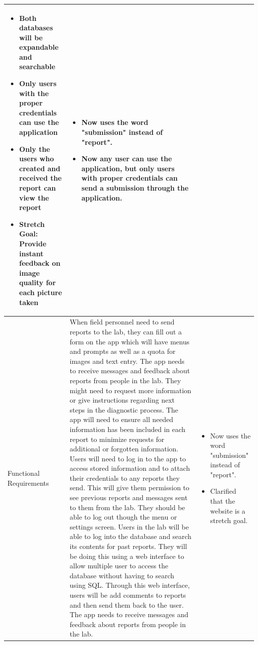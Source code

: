 \documentclass[onecolumn, draftclsnofoot,10pt, compsoc]{IEEEtran}
\begin{document}
\begin{table}[!hbt]
\begin{tabularx}{\textwidth}{|>{\setlength\hsize{.6\hsize}\setlength\linewidth{\hsize}}X|>{\setlength\hsize{1.6\hsize}\setlength\linewidth{\hsize}}X|>{\setlength\hsize{.8\hsize}\setlength\linewidth{\hsize}}X|}
\begin{itemize}
\item Both databases will be expandable and searchable

\item Only users with the proper credentials can use the application

\item Only the users who created and received the report can view the report

\item Stretch Goal: Provide instant feedback on image quality for each picture taken

\end{itemize}
&
\begin{itemize}
    \item Now uses the word "submission" instead of "report".
    \item Now any user can use the application, but only users with proper credentials can send a submission through the application. 
\end{itemize}\\

\hline

Functional Requirements
&

When field personnel need to send reports to the lab, they can fill out a form on the app which will have menus and prompts as well as a quota for images and text entry.
\newline
The app needs to receive messages and feedback about reports from people in the lab. 
They might need to request more information or give instructions regarding next steps in the diagnostic process. 
The app will need to ensure all needed information has been included in each report to minimize requests for additional or forgotten information. 
\newline
Users will need to log in to the app to access stored information and to attach their credentials to any reports they send. This will give them permission to see previous reports and messages sent to them from the lab. 
They should be able to log out though the menu or settings screen. 
\newline 
Users in the lab will be able to log into the database and search its contents for past reports. They will be doing this using a web interface to allow multiple user to access the database without having to search using SQL. Through this web interface, users will be add comments to reports and then send them back to the user. 
\newline
The app needs to receive messages and feedback about reports from people in the lab. 
&
\begin{itemize}
    \item Now uses the word "submission" instead of "report".
    \item Clarified that the website is a stretch goal.
\end{itemize}\\


\end{tabularx}
\end{table}
\end{document}

